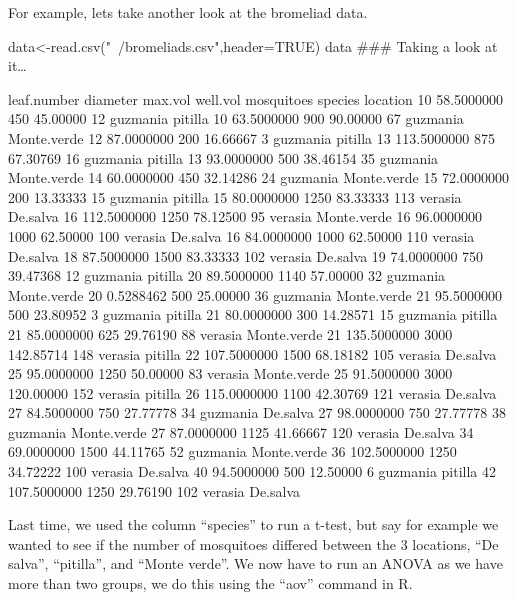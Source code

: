 \documentclass{article}
\begin{document}
For example, lets take another look at the bromeliad data. 

data<-read.csv("~/bromeliads.csv",header=TRUE)
data   \#\#\# Taking a look at it…


leaf.number   diameter   max.vol well.vol mosquitoes species    location
10    58.5000000     450  45.00000         12 guzmania     pitilla
10    63.5000000     900  90.00000         67 guzmania Monte.verde
12    87.0000000     200  16.66667          3 guzmania     pitilla
13   113.5000000     875  67.30769         16 guzmania     pitilla
13    93.0000000     500  38.46154         35 guzmania Monte.verde
14    60.0000000     450  32.14286         24 guzmania Monte.verde
15    72.0000000     200  13.33333         15 guzmania     pitilla
15    80.0000000    1250  83.33333        113  verasia    De.salva
16   112.5000000    1250  78.12500         95  verasia Monte.verde
16    96.0000000    1000  62.50000        100  verasia    De.salva
16    84.0000000    1000  62.50000        110  verasia    De.salva
18    87.5000000    1500  83.33333        102  verasia    De.salva
19    74.0000000     750  39.47368         12 guzmania     pitilla
20    89.5000000    1140  57.00000         32 guzmania Monte.verde
20     0.5288462     500  25.00000         36 guzmania Monte.verde
21    95.5000000     500  23.80952          3 guzmania     pitilla
21    80.0000000     300  14.28571         15 guzmania     pitilla
21    85.0000000     625  29.76190         88  verasia Monte.verde
21   135.5000000    3000 142.85714        148  verasia     pitilla
22   107.5000000    1500  68.18182        105  verasia    De.salva
25    95.0000000    1250  50.00000         83  verasia Monte.verde
25    91.5000000    3000 120.00000        152  verasia     pitilla
26   115.0000000    1100  42.30769        121  verasia    De.salva
27    84.5000000     750  27.77778         34 guzmania    De.salva
27    98.0000000     750  27.77778         38 guzmania Monte.verde
27    87.0000000    1125  41.66667        120  verasia    De.salva
34    69.0000000    1500  44.11765         52 guzmania Monte.verde
36   102.5000000    1250  34.72222        100  verasia    De.salva
40    94.5000000     500  12.50000          6 guzmania     pitilla
42   107.5000000    1250  29.76190        102  verasia    De.salva

Last time, we used the column “species” to run a t-test, but say for example we wanted to see if the number of mosquitoes differed between the 3 locations, “De salva”, “pitilla”, and “Monte verde”. We now have to run an ANOVA as we have more than two groups, we do this using the “aov” command in R. 
\end{document}
